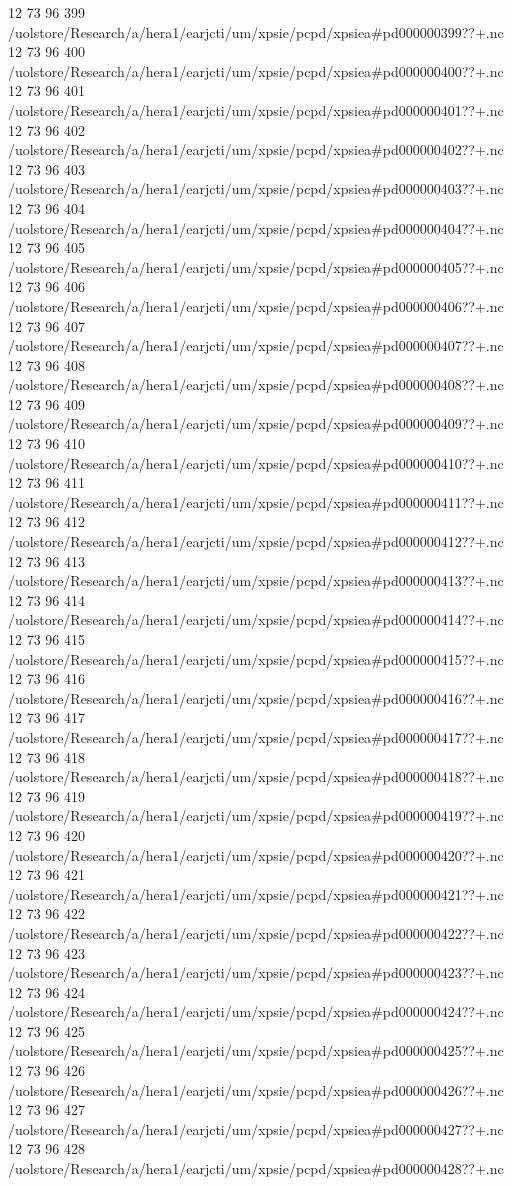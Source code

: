 12 73 96
399
/uolstore/Research/a/hera1/earjcti/um/xpsie/pcpd/xpsiea#pd000000399??+.nc
12 73 96
400
/uolstore/Research/a/hera1/earjcti/um/xpsie/pcpd/xpsiea#pd000000400??+.nc
12 73 96
401
/uolstore/Research/a/hera1/earjcti/um/xpsie/pcpd/xpsiea#pd000000401??+.nc
12 73 96
402
/uolstore/Research/a/hera1/earjcti/um/xpsie/pcpd/xpsiea#pd000000402??+.nc
12 73 96
403
/uolstore/Research/a/hera1/earjcti/um/xpsie/pcpd/xpsiea#pd000000403??+.nc
12 73 96
404
/uolstore/Research/a/hera1/earjcti/um/xpsie/pcpd/xpsiea#pd000000404??+.nc
12 73 96
405
/uolstore/Research/a/hera1/earjcti/um/xpsie/pcpd/xpsiea#pd000000405??+.nc
12 73 96
406
/uolstore/Research/a/hera1/earjcti/um/xpsie/pcpd/xpsiea#pd000000406??+.nc
12 73 96
407
/uolstore/Research/a/hera1/earjcti/um/xpsie/pcpd/xpsiea#pd000000407??+.nc
12 73 96
408
/uolstore/Research/a/hera1/earjcti/um/xpsie/pcpd/xpsiea#pd000000408??+.nc
12 73 96
409
/uolstore/Research/a/hera1/earjcti/um/xpsie/pcpd/xpsiea#pd000000409??+.nc
12 73 96
410
/uolstore/Research/a/hera1/earjcti/um/xpsie/pcpd/xpsiea#pd000000410??+.nc
12 73 96
411
/uolstore/Research/a/hera1/earjcti/um/xpsie/pcpd/xpsiea#pd000000411??+.nc
12 73 96
412
/uolstore/Research/a/hera1/earjcti/um/xpsie/pcpd/xpsiea#pd000000412??+.nc
12 73 96
413
/uolstore/Research/a/hera1/earjcti/um/xpsie/pcpd/xpsiea#pd000000413??+.nc
12 73 96
414
/uolstore/Research/a/hera1/earjcti/um/xpsie/pcpd/xpsiea#pd000000414??+.nc
12 73 96
415
/uolstore/Research/a/hera1/earjcti/um/xpsie/pcpd/xpsiea#pd000000415??+.nc
12 73 96
416
/uolstore/Research/a/hera1/earjcti/um/xpsie/pcpd/xpsiea#pd000000416??+.nc
12 73 96
417
/uolstore/Research/a/hera1/earjcti/um/xpsie/pcpd/xpsiea#pd000000417??+.nc
12 73 96
418
/uolstore/Research/a/hera1/earjcti/um/xpsie/pcpd/xpsiea#pd000000418??+.nc
12 73 96
419
/uolstore/Research/a/hera1/earjcti/um/xpsie/pcpd/xpsiea#pd000000419??+.nc
12 73 96
420
/uolstore/Research/a/hera1/earjcti/um/xpsie/pcpd/xpsiea#pd000000420??+.nc
12 73 96
421
/uolstore/Research/a/hera1/earjcti/um/xpsie/pcpd/xpsiea#pd000000421??+.nc
12 73 96
422
/uolstore/Research/a/hera1/earjcti/um/xpsie/pcpd/xpsiea#pd000000422??+.nc
12 73 96
423
/uolstore/Research/a/hera1/earjcti/um/xpsie/pcpd/xpsiea#pd000000423??+.nc
12 73 96
424
/uolstore/Research/a/hera1/earjcti/um/xpsie/pcpd/xpsiea#pd000000424??+.nc
12 73 96
425
/uolstore/Research/a/hera1/earjcti/um/xpsie/pcpd/xpsiea#pd000000425??+.nc
12 73 96
426
/uolstore/Research/a/hera1/earjcti/um/xpsie/pcpd/xpsiea#pd000000426??+.nc
12 73 96
427
/uolstore/Research/a/hera1/earjcti/um/xpsie/pcpd/xpsiea#pd000000427??+.nc
12 73 96
428
/uolstore/Research/a/hera1/earjcti/um/xpsie/pcpd/xpsiea#pd000000428??+.nc
